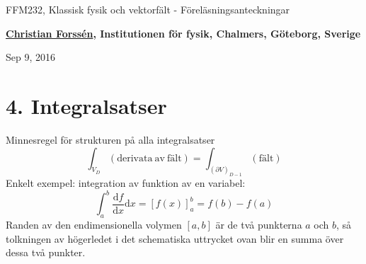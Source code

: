 \documentclass[%
oneside,                 %
final,                   %
10pt]{article}
\begin{document}






\thispagestyle{empty}

\begin{center}
{\LARGE\bf
\begin{spacing}{1.25}
FFM232, Klassisk fysik och vektorfält - Föreläsningsanteckningar
\end{spacing}
}
\end{center}


\begin{center}
{\bf \href{{http://fy.chalmers.se/subatom/tsp/}}{Christian Forssén}, Institutionen för fysik, Chalmers, Göteborg, Sverige${}^{}$} \\ [0mm]
\end{center}

\begin{center}
\end{center}
    

\begin{center}
Sep 9, 2016
\end{center}

\vspace{1cm}


\section{4. Integralsatser}

Minnesregel för strukturen på alla integralsatser
\begin{equation}
  \int_{V_D} (\mathrm{derivata~av~fält}) = \int_{(\partial V)_{D-1}} (\mathrm{fält})
\end{equation}
Enkelt exempel: integration av funktion av en variabel:
\begin{equation}
\int_a^b \frac{\mbox{d}f}{\mbox{d}x} \mbox{d}x = \left[ f(x) \right]_a^b = f(b)-f(a)
\end{equation}
Randen av den endimensionella volymen $[a,b]$ är de två punkterna $a$ och $b$, så tolkningen av högerledet i det schematiska uttrycket ovan blir en summa över dessa två punkter.
\end{document}
